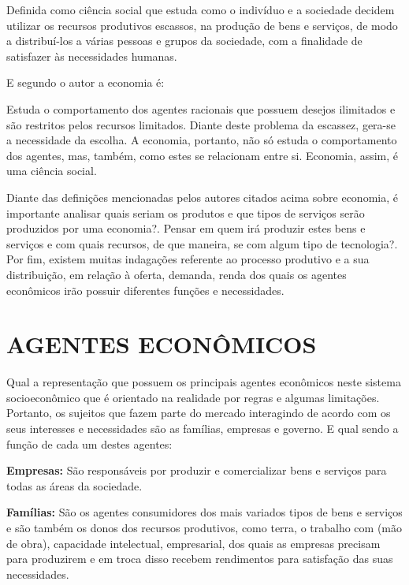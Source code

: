 \documentclass[
12pt,				%
oneside,			%
a4paper,			%
section=TITLE,
brazil,				%
]{abntex2}
\let\oldsection\section
\renewcommand\section{\clearpage\oldsection}
\begin{document}
  \begin{citacao}
    Definida como ciência social que estuda como o indivíduo e a sociedade decidem
    utilizar os recursos produtivos escassos, na produção de bens e serviços, de
    modo a distribuí-los a várias pessoas e grupos da sociedade, com a finalidade
    de satisfazer às necessidades humanas.\cite[p.15]{de2006economia}
  \end{citacao}

  E segundo o autor\cite{giambiagi2016macroeconomia} a economia é:

  \begin{citacao}
    Estuda o comportamento dos agentes racionais que possuem desejos ilimitados e
    são restritos pelos recursos limitados. Diante deste problema da escassez,
    gera-se a necessidade da escolha. A economia, portanto, não só estuda o
    comportamento dos agentes, mas, também, como estes se relacionam entre si.
    Economia, assim, é uma ciência social.\cite[p.15]{giambiagi2016macroeconomia}
  \end{citacao}

  Diante das definições mencionadas pelos autores citados acima sobre economia, é
  importante analisar quais seriam os  produtos e que tipos de serviços serão
  produzidos por uma economia?. Pensar em quem irá produzir estes bens e serviços
  e com quais recursos, de que maneira, se com algum tipo de tecnologia?.  Por
  fim, existem muitas indagações referente ao processo produtivo e a sua
  distribuição, em relação à oferta, demanda, renda dos quais os agentes
  econômicos irão possuir diferentes funções e necessidades.

  \section{AGENTES ECONÔMICOS}

  Qual a representação que possuem os principais agentes econômicos neste sistema
  socioeconômico que é orientado na realidade por regras e algumas limitações.
  Portanto, os sujeitos que fazem parte do mercado interagindo de acordo com os
  seus interesses e necessidades são as famílias, empresas e  governo. E
  qual sendo a função de cada um destes agentes:

  \textbf{Empresas:} São responsáveis por produzir e comercializar bens e serviços
  para todas as áreas da sociedade.

  \textbf{Famílias:} São os agentes consumidores dos mais variados tipos de bens e
  serviços e são também os donos dos recursos produtivos, como terra, o trabalho
  com (mão de obra), capacidade intelectual, empresarial, dos quais as empresas
  precisam para produzirem e em troca disso recebem rendimentos para satisfação
  das suas necessidades.
\end{document}

